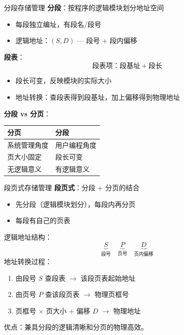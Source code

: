 \documentclass[10pt, aspectratio=169]{beamer}
\begin{document}
\begin{frame}{分段存储管理}
    \textbf{分段}：按程序的逻辑模块划分地址空间
    \begin{itemize}
        \item 每段独立编址，有段名/段号
        \item 逻辑地址：$(S, D)$ --- 段号 + 段内偏移
    \end{itemize}
    \vspace{0.5em}
    \textbf{段表}：
    \[
    \text{段表项}：\text{段基址} + \text{段长}
    \]
    \begin{itemize}
        \item 段长可变，反映模块的实际大小
        \item 地址转换：查段表得到段基址，加上偏移得到物理地址
    \end{itemize}
    \vspace{0.5em}
    \textbf{分段 vs 分页}：
    \begin{center}
        \begin{tabular}{|l|l|}
            \hline
            \textbf{分页} & \textbf{分段} \\
            \hline
            系统管理角度 & 用户编程角度 \\
            页大小固定 & 段长可变 \\
            无逻辑意义 & 有逻辑意义 \\
            \hline
        \end{tabular}
    \end{center}
\end{frame}

\begin{frame}{段页式存储管理}
    \textbf{段页式}：分段 + 分页的结合
    \begin{itemize}
        \item 先分段（逻辑模块划分），每段内再分页
        \item 每段有自己的页表
    \end{itemize}
    \vspace{0.5em}
    逻辑地址结构：
    \[
    \underbrace{S}_{\text{段号}} \quad
    \underbrace{P}_{\text{页号}} \quad
    \underbrace{D}_{\text{页内偏移}}
    \]
    \vspace{0.5em}
    地址转换过程：
    \begin{enumerate}
        \item 由段号 $S$ 查段表 $\rightarrow$ 该段页表起始地址
        \item 由页号 $P$ 查该段页表 $\rightarrow$ 物理页框号
        \item 页框号 $\times$ 页大小 + 偏移 $D$ $\rightarrow$ 物理地址
    \end{enumerate}
    优点：兼具分段的逻辑清晰和分页的物理高效。
\end{frame}
\end{document}

